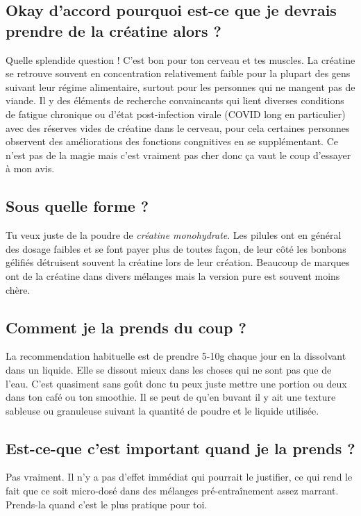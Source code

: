 \documentclass{article}
\begin{document}
\subsection{Okay d'accord pourquoi est-ce que je devrais prendre de la créatine alors ?}

Quelle splendide question ! C'est bon pour ton cerveau et tes muscles. La créatine se retrouve souvent en concentration relativement faible pour la plupart des gens suivant leur régime alimentaire, surtout pour les personnes qui ne mangent pas de viande. Il y des éléments de recherche convaincants qui lient diverses conditions de fatigue chronique ou d'état post-infection virale (COVID long en particulier) avec des réserves vides de créatine dans le cerveau, pour cela certaines personnes observent des améliorations des fonctions congnitives en se supplémentant. Ce n'est pas de la magie mais c'est vraiment pas cher donc ça vaut le coup d'essayer à mon avis.

\subsection{Sous quelle forme ?}

Tu veux juste de la poudre de \textit{créatine monohydrate}. Les pilules ont en général des dosage faibles et se font payer plus de toutes façon, de leur côté les bonbons gélifiés détruisent souvent la créatine lors de leur création. Beaucoup de marques ont de la créatine dans divers mélanges mais la version pure est souvent moins chère.

\subsection{Comment je la prends du coup ?}

La recommendation habituelle est de prendre 5-10g chaque jour en la dissolvant dans un liquide. Elle se dissout mieux dans les choses qui ne sont pas que de l'eau. C'est quasiment sans goût donc tu peux juste mettre une portion ou deux dans ton café ou ton smoothie. Il se peut de qu'en buvant il y ait une texture sableuse ou granuleuse suivant la quantité de poudre et le liquide utilisée.

\subsection{Est-ce-que c'est important quand je la prends ?}

Pas vraiment. Il n'y a pas d'effet immédiat qui pourrait le justifier, ce qui rend le fait que ce soit micro-dosé dans des mélanges pré-entraînement assez marrant. Prends-la quand c'est le plus pratique pour toi.
\end{document}
